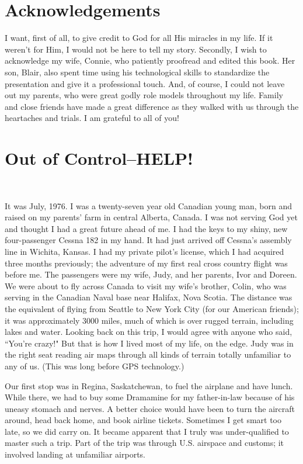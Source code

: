 \documentclass[oneside,12pt]{book}
\begin{document}
\chapter{Acknowledgements}
I want, first of all, to give credit to God for all His miracles in my life. If it weren't for Him, I would not be here to tell my story. Secondly, I wish to acknowledge my wife, Connie, who patiently proofread and edited this book. Her son, Blair, also spent time using his technological skills to standardize the presentation and give it a professional touch. And, of course, I could not leave out my parents, who were great godly role models throughout my life. Family and close friends have made a great difference as they walked with us through the heartaches and trials. I am grateful to all of you!
\clearpage
\tableofcontents
\clearpage
\mainmatter
\chapter{Out of Control--HELP!}
\

It was July, 1976. I was a twenty-seven year old Canadian young man, born and raised on my parents' farm in central Alberta, Canada. I was not serving God yet and thought I had a great future ahead of me. I had the keys to my shiny, new four-passenger Cessna 182 in my hand. It had just arrived off Cessna's assembly line in Wichita, Kansas. I had my private pilot's license, which I had acquired three months previously; the adventure of my first real cross country flight was before me. The passengers were my wife, Judy, and her parents, Ivor and Doreen. We were about to fly across Canada to visit my wife's brother, Colin, who was serving in the Canadian Naval base near Halifax, Nova Scotia. The distance was the equivalent of flying from Seattle to New York City (for our American friends); it was approximately 3000 miles, much of which is over rugged terrain, including lakes and water. Looking back on this trip, I would agree with anyone who said, ``You're crazy!" But that is how I lived most of my life, on the edge. Judy was in the right seat reading air maps through all kinds of terrain totally unfamiliar to any of us. (This was long before GPS technology.)

Our first stop was in Regina, Saskatchewan, to fuel the airplane and have lunch. While there, we had to buy some Dramamine for my father-in-law because of his uneasy stomach and nerves. A better choice would have been to turn the aircraft around, head back home, and book airline tickets. Sometimes I get smart too late, so we did carry on. It became apparent that I truly was under-qualified to master such a trip. Part of the trip was through U.S. airspace and customs; it involved landing at unfamiliar airports. 
\end{document}
